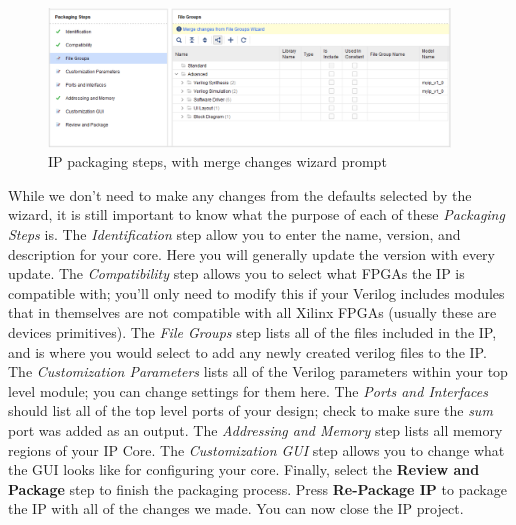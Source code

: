 \documentclass[11pt]{article}
\begin{document}
\begin{figure}[!h]
    \centering
    \includegraphics[width=0.95\textwidth]{images/merge_changes.png}
    \caption{IP packaging steps, with merge changes wizard prompt}
    \label{fig:merge_changes}
\end{figure}

While we don't need to make any changes from the defaults selected by the wizard, it is still important to know what the purpose of each of these \textit{Packaging Steps} is. The \textit{Identification} step allow you to enter the name, version, and description for your core. Here you will generally update the version with every update. The \textit{Compatibility} step allows you to select what FPGAs the IP is compatible with; you'll only need to modify this if your Verilog includes modules that in themselves are not compatible with all Xilinx FPGAs (usually these are devices primitives). The \textit{File Groups} step lists all of the files included in the IP, and is where you would select to add any newly created verilog files to the IP. The \textit{Customization Parameters} lists all of the Verilog parameters within your top level module; you can change settings for them here. The \textit{Ports and Interfaces} should list all of the top level ports of your design; check to make sure the \textit{sum} port was added as an output. The \textit{Addressing and Memory} step lists all memory regions of your IP Core. The \textit{Customization GUI} step allows you to change what the GUI looks like for configuring your core. Finally, select the \textbf{Review and Package} step to finish the packaging process. Press \textbf{Re-Package IP} to package the IP with all of the changes we made. You can now close the IP project.
\end{document}
